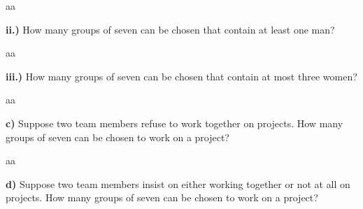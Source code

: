 \documentclass[titlepage, letterpaper, fleqn]{article}
\newcommand{\spacepls}{\vspace{5mm}}
\begin{document}
aa

{\large \textbf{ii.)} How many groups of seven can be chosen that contain at least one man?}

\spacepls

aa

{\large \textbf{iii.)} How many groups of seven can be chosen that contain at most three women?}

\spacepls

aa

{\large \textbf{c)} Suppose two team members refuse to work together on projects. How many groups of seven can be chosen to work on a project?}

\spacepls

aa

{\large \textbf{d)} Suppose two team members insist on either working together or not at all on projects. How many groups of seven can be chosen to work on a project?}
\end{document}

